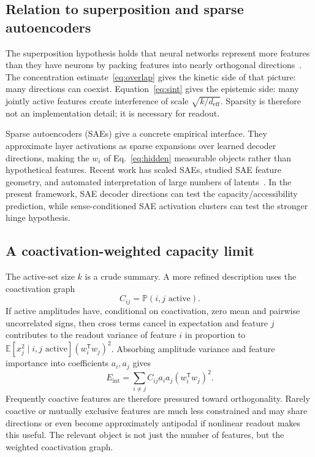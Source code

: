 \documentclass[
  aps,
  reprint,
  superscriptaddress,
  floatfix,
  nofootinbib,
  longbibliography
]{revtex4-2}
\newcommand{\E}{\mathbb{E}}
\newcommand{\Prob}{\mathbb{P}}
\newcommand{\deff}{d_{\mathrm{eff}}}
\newcommand{\Eint}{E_{\mathrm{int}}}
\newcommand{\T}{^{\mathsf{T}}}
\begin{document}
\subsection{Relation to superposition and sparse autoencoders}
\label{sec:superposition}

The superposition hypothesis holds that neural networks represent more
features than they have neurons by packing features into nearly
orthogonal directions~\cite{elhage2022superposition,bricken2023monosemanticity}. The concentration
estimate~\eqref{eq:overlap} gives the kinetic side of that picture:
many directions can coexist. Equation~\eqref{eq:sint} gives the
epistemic side: many jointly active features create interference of
scale $\sqrt{k/\deff}$. Sparsity is therefore not an implementation
detail; it is necessary for readout.

Sparse autoencoders (SAEs) give a concrete empirical interface. They
approximate layer activations as sparse expansions over learned decoder
directions, making the $w_i$ of Eq.~\eqref{eq:hidden} measurable
objects rather than hypothetical features. Recent work has scaled SAEs,
studied SAE feature geometry, and automated interpretation of large
numbers of latents~\cite{gao2025scaling,li2025geometry,paulo2025automatically,shu2025survey}. In the
present framework, SAE decoder directions can test the
capacity/accessibility prediction, while sense-conditioned SAE
activation clusters can test the stronger hinge hypothesis.

\subsection{A coactivation-weighted capacity limit}
\label{sec:capacity-limit}

The active-set size $k$ is a crude summary. A more refined description
uses the coactivation graph
%
\begin{equation}
\label{eq:coactivation}
C_{ij}=\Prob(i,j\text{ active}).
\end{equation}
%
If active amplitudes have, conditional on coactivation, zero mean and
pairwise uncorrelated signs, then cross terms cancel in expectation and
feature $j$ contributes to the readout variance of feature $i$ in
proportion to
$\E[x_j^2\mid i,j\text{ active}](w_i\T w_j)^2$. Absorbing amplitude
variance and feature importance into coefficients $a_i,a_j$ gives
%
\begin{equation}
\label{eq:int-energy}
\Eint=
\sum_{i\neq j}
C_{ij}a_i a_j (w_i\T w_j)^2 .
\end{equation}
%
Frequently coactive features are therefore pressured toward
orthogonality. Rarely coactive or mutually exclusive features are much
less constrained and may share directions or even become approximately
antipodal if nonlinear readout makes this useful. The relevant object
is not just the number of features, but the weighted coactivation graph.
\end{document}
